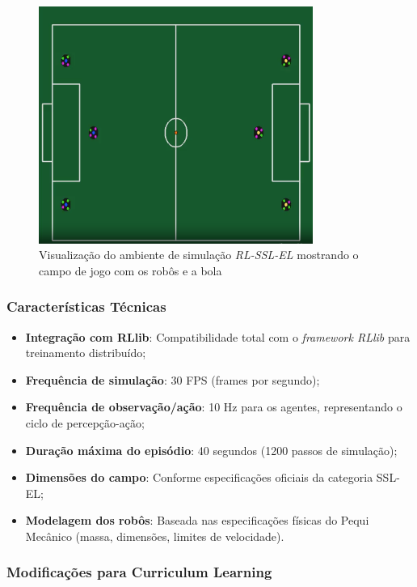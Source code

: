 \begin{figure}[h]
    \centering
    \includegraphics[width=0.8\textwidth]{fig/campo}
    \caption{Visualização do ambiente de simulação \textit{RL-SSL-EL} mostrando o campo de jogo com os robôs e a bola}
    \label{fig:campo_simulacao}
\end{figure}


\subsubsection{Características Técnicas}

\begin{itemize}
    \item \textbf{Integração com RLlib}: Compatibilidade total com o \textit{framework RLlib} para treinamento distribuído;
    \item \textbf{Frequência de simulação}: 30 FPS (frames por segundo);
    \item \textbf{Frequência de observação/ação}: 10 Hz para os agentes, representando o ciclo de percepção-ação;
    \item \textbf{Duração máxima do episódio}: 40 segundos (1200 passos de simulação);
    \item \textbf{Dimensões do campo}: Conforme especificações oficiais da categoria SSL-EL;
    \item \textbf{Modelagem dos robôs}: Baseada nas especificações físicas do Pequi Mecânico (massa, dimensões, limites de velocidade).
\end{itemize}

\subsubsection{Modificações para Curriculum Learning}

